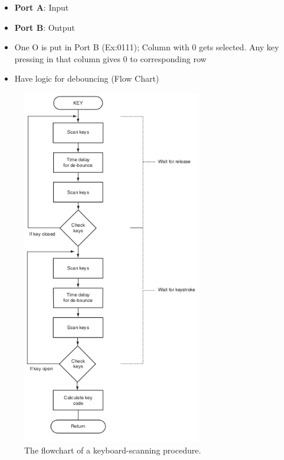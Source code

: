 \begin{itemize}
  \item \textbf{Port A}: Input
  \item \textbf{Port B}: Output
  \item One O is put in Port B (Ex:0111); Column with 0 gets selected. Any key pressing in that column gives 0 to corresponding row
  \item Have logic for debouncing (Flow Chart)

\end{itemize}

\begin{figure}[h!]
  \centering
  \includegraphics[width = 0.7\textwidth]{./figures/Debounce.png}
  \caption{The flowchart of a keyboard-scanning procedure.}
\end{figure}
\newpage
